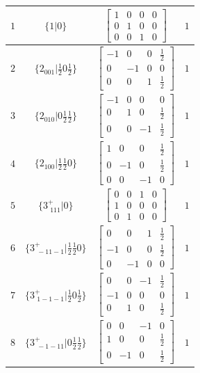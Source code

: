 \documentclass[fleqn,8pt]{jsarticle}
\begin{document}
\begin{longtable}{cccc}
$ 1 $ & $ \{1|0\} $ & $ \begin{bmatrix} 1 & 0 & 0 & 0 \\ 0 & 1 & 0 & 0 \\ 0 & 0 & 1 & 0 \end{bmatrix} $ & $ 1 $ \\ \hline
$ 2 $ & $ \{2{}_{001}|\frac{1}{2} 0 \frac{1}{2}\} $ & $ \begin{bmatrix} -1 & 0 & 0 & \frac{1}{2} \\ 0 & -1 & 0 & 0 \\ 0 & 0 & 1 & \frac{1}{2} \end{bmatrix} $ & $ 1 $ \\ \hline
$ 3 $ & $ \{2{}_{010}|0 \frac{1}{2} \frac{1}{2}\} $ & $ \begin{bmatrix} -1 & 0 & 0 & 0 \\ 0 & 1 & 0 & \frac{1}{2} \\ 0 & 0 & -1 & \frac{1}{2} \end{bmatrix} $ & $ 1 $ \\ \hline
$ 4 $ & $ \{2{}_{100}|\frac{1}{2} \frac{1}{2} 0\} $ & $ \begin{bmatrix} 1 & 0 & 0 & \frac{1}{2} \\ 0 & -1 & 0 & \frac{1}{2} \\ 0 & 0 & -1 & 0 \end{bmatrix} $ & $ 1 $ \\ \hline
$ 5 $ & $ \{3^{+}_{\,\,111}|0\} $ & $ \begin{bmatrix} 0 & 0 & 1 & 0 \\ 1 & 0 & 0 & 0 \\ 0 & 1 & 0 & 0 \end{bmatrix} $ & $ 1 $ \\ \hline
$ 6 $ & $ \{3^{+}_{\,\,-11-1}|\frac{1}{2} \frac{1}{2} 0\} $ & $ \begin{bmatrix} 0 & 0 & 1 & \frac{1}{2} \\ -1 & 0 & 0 & \frac{1}{2} \\ 0 & -1 & 0 & 0 \end{bmatrix} $ & $ 1 $ \\ \hline
$ 7 $ & $ \{3^{+}_{\,\,1-1-1}|\frac{1}{2} 0 \frac{1}{2}\} $ & $ \begin{bmatrix} 0 & 0 & -1 & \frac{1}{2} \\ -1 & 0 & 0 & 0 \\ 0 & 1 & 0 & \frac{1}{2} \end{bmatrix} $ & $ 1 $ \\ \hline
$ 8 $ & $ \{3^{+}_{\,\,-1-11}|0 \frac{1}{2} \frac{1}{2}\} $ & $ \begin{bmatrix} 0 & 0 & -1 & 0 \\ 1 & 0 & 0 & \frac{1}{2} \\ 0 & -1 & 0 & \frac{1}{2} \end{bmatrix} $ & $ 1 $ \\ \hline

\end{longtable}
\end{document}
